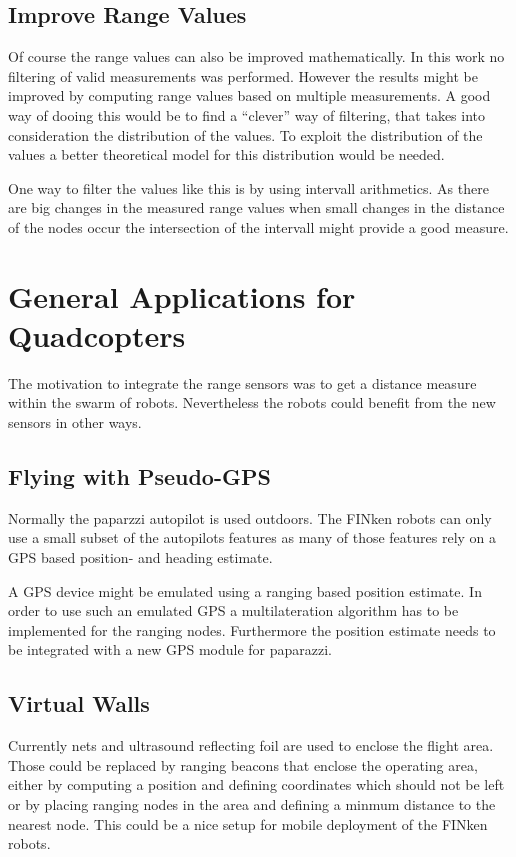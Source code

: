 \subsection{Improve Range Values}

Of course the range values can also be improved mathematically.
In this work no filtering of valid measurements was performed.
However the results might be improved by computing range values based on multiple measurements.
A good way of dooing this would be to find a “clever” way of filtering, that takes into consideration the distribution of the values.
To exploit the distribution of the values a better theoretical model for this distribution would be needed.

One way to filter the values like this is by using intervall arithmetics.
As there are big changes in the measured range values when small changes in the distance of the nodes occur the intersection of the intervall might provide a good measure.




\section{General Applications for Quadcopters}

The motivation to integrate the range sensors was to get a distance measure within the swarm of robots.
Nevertheless the robots could benefit from the new sensors in other ways.

\subsection{Flying with Pseudo-GPS}
Normally the paparzzi autopilot is used outdoors.
The FINken robots can only use a small subset of the autopilots features as many of those features rely on a GPS based position- and heading estimate.

A GPS device might be emulated using a ranging based position estimate.
In order to use such an emulated GPS a multilateration algorithm has to be implemented for the ranging nodes.
Furthermore the position estimate needs to be integrated with a new GPS module for paparazzi.


\subsection{Virtual Walls}
\label{boundingbox}
Currently nets and ultrasound reflecting foil are used to enclose the flight area.
Those could be replaced by ranging beacons that enclose the operating area, either by computing a position and defining coordinates which should not be left or by placing ranging nodes in the area and defining a minmum distance to the nearest node.
This could be a nice setup for mobile deployment of the FINken robots.


